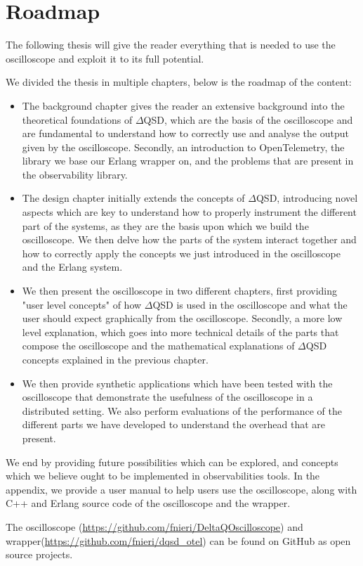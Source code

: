 \section{Roadmap}
    The following thesis will give the reader everything that is needed to use the oscilloscope and exploit it to its full potential.

    We divided the thesis in multiple chapters, below is the roadmap of the content:
    \begin{itemize}
        \item The background chapter gives the reader an extensive background into the theoretical foundations of $\Delta$QSD, which are the basis of the oscilloscope and are fundamental to understand how to correctly use and analyse the output given by the oscilloscope. Secondly, an introduction to OpenTelemetry, the library we base our Erlang wrapper on, and the problems that are present in the observability library.
        \item The design chapter initially extends the concepts of $\Delta$QSD, introducing novel aspects which are key to understand how to properly instrument the different part of the systems, as they are the basis upon which we build the oscilloscope. We then delve how the parts of the system interact together and how to correctly apply the concepts we just introduced in the oscilloscope and the Erlang system.
        \item We then present the oscilloscope in two different chapters, first providing "user level concepts" of how $\Delta$QSD is used in the oscilloscope and what the user should expect graphically from the oscilloscope.
            Secondly, a more low level explanation, which goes into more technical details of the parts that compose the oscilloscope and the mathematical explanations of $\Delta$QSD concepts explained in the previous chapter.
        \item We then provide synthetic applications which have been tested with the oscilloscope that demonstrate the usefulness of the oscilloscope in a distributed setting. We also perform evaluations of the performance of the different parts we have developed to understand the overhead that are present.
    \end{itemize}

    We end by providing future possibilities which can be explored, and concepts which we believe ought to be implemented in observabilities tools. 
    In the appendix, we provide a user manual to help users use the oscilloscope, along with C++ and Erlang source code of the oscilloscope and the wrapper.

    The oscilloscope (\url{https://github.com/fnieri/DeltaQOscilloscope}) and wrapper(\url{https://github.com/fnieri/dqsd_otel}) can be found on GitHub as open source projects.
